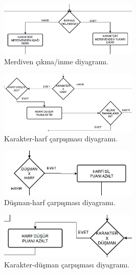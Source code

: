 \documentclass[12pt,a4paper]{article}
\begin{document}
   \begin{figure}[!htb]
      \begin{center}
            \includegraphics[width=250px]{img/st.png}
            \caption{Merdiven çıkma/inme diyagramı.}
            \label{fig:st}
      \end{center}
   \end{figure}

   \begin{figure}[!htb]
      \begin{center}
            \includegraphics[width=250px]{img/cxl.png}
            \caption{Karakter-harf çarpışması diyagramı.}
            \label{fig:cxl}
      \end{center}
   \end{figure}

   \begin{figure}[!htb]
      \begin{center}
            \includegraphics[width=250px]{img/exl.png}
            \caption{Düşman-harf çarpışması diyagramı.}
            \label{fig:exl}
      \end{center}
   \end{figure}

   \begin{figure}[!htb]
      \begin{center}
            \includegraphics[width=250px]{img/cxe.png}
            \caption{Karakter-düşman çarpışması diyagramı.}
            \label{fig:cxe}
      \end{center}
   \end{figure}
\end{document}
